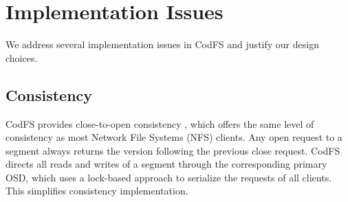 



\section{Implementation Issues}
\label{sec:issues}

We address several implementation issues in CodFS and justify our design
choices. 

\subsection{Consistency} CodFS provides close-to-open consistency
\cite{howard88}, which offers the same level of consistency as most Network
File Systems (NFS) clients. Any open request to a segment always
returns the version following the previous close request. CodFS directs all
reads and writes of a segment through the corresponding primary OSD, which
uses a lock-based approach to serialize the requests of all clients.  This
simplifies consistency implementation. 

